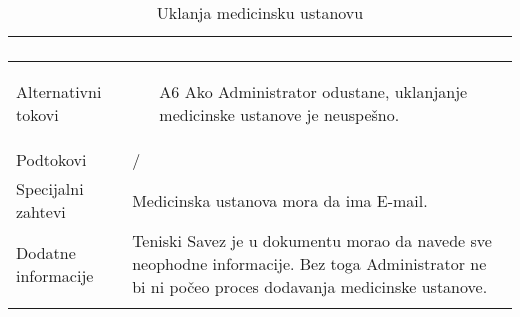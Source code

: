 \documentclass{article}
\begin{document}
\begin{longtable}{| p{} | p{} |}
\begin{enumerate}
                \end{enumerate}\\
            \hline
                Alternativni tokovi & 
                \begin{itemize}
                    \item[A6] Ako Administrator odustane, uklanjanje medicinske ustanove je neuspešno.
                \end{itemize} \\
            \hline
                Podtokovi & /\\
            \hline
                Specijalni zahtevi &  Medicinska ustanova mora da ima E-mail.\\
            \hline
                Dodatne informacije & Teniski Savez je u dokumentu morao da navede sve neophodne informacije. Bez toga Administrator ne bi ni počeo proces dodavanja medicinske ustanove.\\
            \hline
            \caption{Uklanja medicinsku ustanovu}
        \end{longtable}
        
\end{document}
